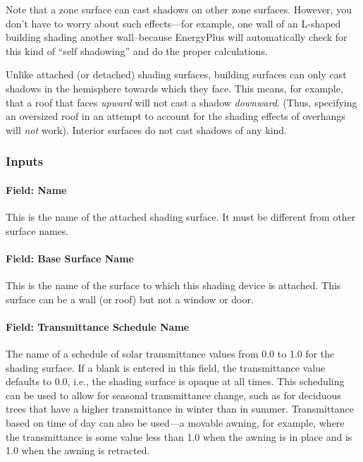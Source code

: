 Note that a zone surface can cast shadows on other zone surfaces. However, you don't have to worry about such effects---for example, one wall of an L-shaped building shading another wall--because EnergyPlus will automatically check for this kind of ``self shadowing'' and do the proper calculations.

Unlike attached (or detached) shading surfaces, building surfaces can only cast shadows in the hemisphere towards which they face. This means, for example, that a roof that faces \emph{upward} will not cast a shadow \emph{downward}. (Thus, specifying an oversized roof in an attempt to account for the shading effects of overhangs will \emph{not} work). Interior surfaces do not cast shadows of any kind.

\subsubsection{Inputs}\label{inputs-30-002}

\paragraph{Field: Name}\label{field-name-28-002}

This is the name of the attached shading surface. It must be different from other surface names.

\paragraph{Field: Base Surface Name}\label{field-base-surface-name}

This is the name of the surface to which this shading device is attached. This surface can be a wall (or roof) but not a window or door.

\paragraph{Field: Transmittance Schedule Name}\label{field-transmittance-schedule-name-1}

The name of a schedule of solar transmittance values from 0.0 to 1.0 for the shading surface. If a blank is entered in this field, the transmittance value defaults to 0.0, i.e., the shading surface is opaque at all times. This scheduling can be used to allow for seasonal transmittance change, such as for deciduous trees that have a higher transmittance in winter than in summer. Transmittance based on time of day can also be used---a movable awning, for example, where the transmittance is some value less than 1.0 when the awning is in place and is 1.0 when the awning is retracted.

